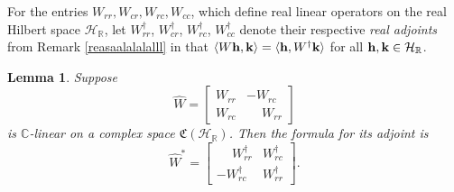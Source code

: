 \documentclass{dis}
\newcommand{\phm}{\phantom{-}}
\theoremstyle{plain}
\newtheorem{Lemma}[equation]{Lemma}
\theoremstyle{definition}
\def\C{\mathbb{C}}
\def\R{\mathbb{R}}
\renewcommand{\vec}[1]{{\bf #1}}
\newcommand{\0}{{\color{lightgray}0}}
\begin{document}
For the entries $W_{rr}, W_{cr}, W_{rc}, W_{cc}$, which define real linear operators on the real Hilbert space $\mathcal{H}_{\R}$, let  $W_{rr}^{\dagger}$, $W_{cr}^{\dagger}$, $W_{rc}^{\dagger}$, $W_{cc}^{\dagger}$ denote their respective {\em real adjoints} from  Remark \ref{reasaalalalalll}  in that $\langle W \vec{h}, \vec{k}\rangle = \langle \vec{h} ,W^{\dagger} \vec{k}\rangle$ for all $\vec{h}, \vec{k} \in \mathcal{H}_{\R}$. 

\begin{Lemma}
Suppose
$$\widehat{W} = \begin{bmatrix} W_{rr} & - W_{rc}\\ W_{rc} &\phm W_{rr}\end{bmatrix}$$ is $\C$-linear on a complex space $\mathfrak{C}(\mathcal{H}_{\R})$. Then the formula for its adjoint is
$$\widehat{W}^{*} = \begin{bmatrix}\phm W_{rr}^{\dagger} & W^{\dagger}_{rc}\\ -W^{\dagger}_{rc} & W_{rr}^{\dagger}\end{bmatrix}.$$
\end{Lemma}
\end{document}
